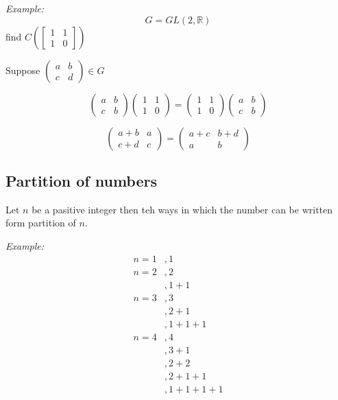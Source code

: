 \documentclass[11pt,letterpaper]{article}
\newenvironment{example}                             
        {\noindent\textit{Example:}\\}
	{}
\begin{document}
\begin{example}
  \[
    G = GL(2,\mathbb{R})
  \]
  find $C\left( \begin{bmatrix}
      1& 1 \\ 1& 0
  \end{bmatrix}\right)$
   

  \noindent Suppose $\begin{pmatrix}
    a & b \\ c & d
  \end{pmatrix} \in G$

  \[
    \begin{pmatrix}
      a& b \\ c& b
    \end{pmatrix} \begin{pmatrix}
      1& 1\\ 1& 0
    \end{pmatrix} = \begin{pmatrix}
      1& 1\\ 1& 0
    \end{pmatrix} \begin{pmatrix}
      a& b \\ c& b
    \end{pmatrix}
  \]

  \[
    \begin{pmatrix}
      a+b & a \\ c+d & c
    \end{pmatrix} = \begin{pmatrix}
      a+c & b+d \\ a & b
    \end{pmatrix}
  \]
\end{example}

\subsection{Partition of numbers}
Let $n$ be a pasitive integer then teh ways in which the number can be written form partition of $n$.

\begin{example}
  \begin{align*}
    n = 1&, 1\\
    n = 2&, 2\\ 
         &, 1+1\\ 
    n = 3&, 3\\ 
         &, 2+1\\ 
         &, 1+1+1\\ 
    n = 4&, 4\\ 
         &, 3+1\\ 
         &, 2+2\\ 
         &, 2+1+1\\ 
         &, 1+1+1+1
  \end{align*}
\end{example}
\end{document}
